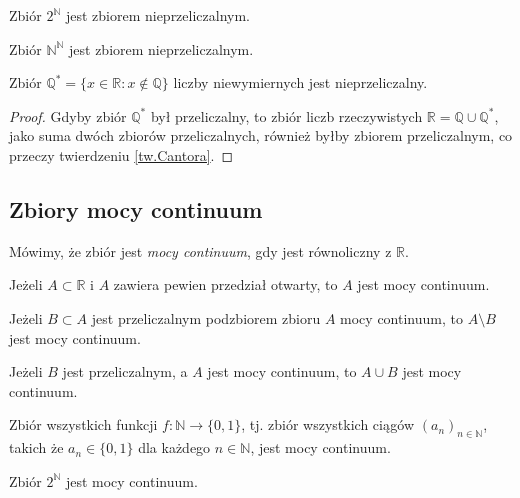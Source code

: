 	\begin{przyk}
		Zbiór $2^{\mathbb{N}}$ jest zbiorem nieprzeliczalnym.
	\end{przyk}
	
	\begin{przyk}
		Zbiór $\mathbb{N}^{\mathbb{N}}$ jest zbiorem nieprzeliczalnym.
	\end{przyk}
	
	\begin{przyk}
		Zbiór $\mathbb{Q}^* = \{ x \in \mathbb{R}: x \not \in \mathbb{Q} \}$ liczby niewymiernych jest nieprzeliczalny.
		\begin{proof}
			Gdyby zbiór $\mathbb{Q}^*$ był przeliczalny, to zbiór liczb rzeczywistych $\mathbb{R} = \mathbb{Q} \cup \mathbb{Q}^*$, jako suma dwóch zbiorów przeliczalnych, również byłby zbiorem przeliczalnym, co przeczy twierdzeniu \ref{tw.Cantora}.
		\end{proof}
	\end{przyk}

	\subsection{Zbiory mocy continuum}	
	\begin{df}
		Mówimy, że zbiór jest \textit{mocy continuum}, gdy jest równoliczny z  $\mathbb{R}$.
	\end{df}
	
	\begin{tw}
		Jeżeli $A \subset \mathbb{R}$ i $A$ zawiera pewien przedział otwarty, to $A$ jest mocy continuum.
	\end{tw}
	
	\begin{tw}
	Jeżeli $B \subset A$ jest przeliczalnym podzbiorem zbioru $A$ mocy continuum, to	$A \setminus B$ jest mocy continuum.
	\end{tw}
	
	\begin{tw}
		Jeżeli $B$ jest przeliczalnym, a  $A$ jest mocy continuum, to $A \cup B$ jest mocy continuum.
	\end{tw}

	\begin{przyk}
		Zbiór wszystkich funkcji $f: \mathbb{N} \to \{0,1\}$, tj. zbiór wszystkich ciągów $(a_n)_{n \in \mathbb{N}}$, takich że $a_n \in \{0,1\}$ dla każdego $n \in \mathbb{N}$, jest mocy continuum.
	\end{przyk}
	
	\begin{przyk}
		Zbiór $ 2^{\mathbb{N}}$ jest mocy continuum.
	\end{przyk}
	
